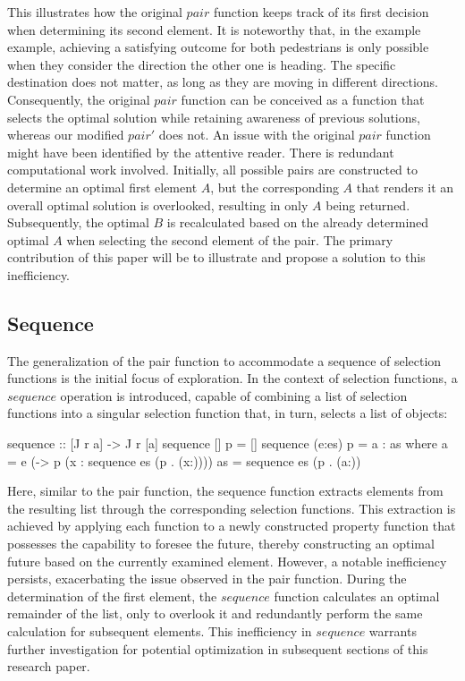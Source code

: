 \documentclass[runningheads]{llncs}
\begin{document}
This illustrates how the original \(pair\) function keeps track of its
first decision when determining its second element. It is noteworthy
that, in the example example, achieving a satisfying outcome for both
pedestrians is only possible when they consider the direction the other
one is heading. The specific destination does not matter, as long as
they are moving in different directions. Consequently, the original
\(pair\) function can be conceived as a function that selects the
optimal solution while retaining awareness of previous solutions,
whereas our modified \(pair'\) does not. An issue with the original
\(pair\) function might have been identified by the attentive reader.
There is redundant computational work involved. Initially, all possible
pairs are constructed to determine an optimal first element \(A\), but
the corresponding \(A\) that renders it an overall optimal solution is
overlooked, resulting in only \(A\) being returned. Subsequently, the
optimal \(B\) is recalculated based on the already determined optimal
\(A\) when selecting the second element of the pair. The primary
contribution of this paper will be to illustrate and propose a solution
to this inefficiency.

\subsection{Sequence}\label{sequence}

The generalization of the pair function to accommodate a sequence of
selection functions is the initial focus of exploration. In the context
of selection functions, a \(sequence\) operation is introduced, capable
of combining a list of selection functions into a singular selection
function that, in turn, selects a list of objects:

\begin{code}
sequence :: [J r a] -> J r [a]
sequence [] p     = []
sequence (e:es) p = a : as
  where 
      a  = e (\x -> p (x : sequence es (p . (x:))))
      as = sequence es (p . (a:))
\end{code}

Here, similar to the pair function, the sequence function extracts
elements from the resulting list through the corresponding selection
functions. This extraction is achieved by applying each function to a
newly constructed property function that possesses the capability to
foresee the future, thereby constructing an optimal future based on the
currently examined element. However, a notable inefficiency persists,
exacerbating the issue observed in the pair function. During the
determination of the first element, the \(sequence\) function calculates
an optimal remainder of the list, only to overlook it and redundantly
perform the same calculation for subsequent elements. This inefficiency
in \(sequence\) warrants further investigation for potential
optimization in subsequent sections of this research paper.
\end{document}
